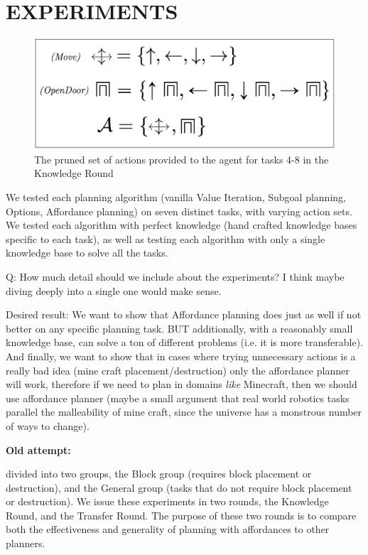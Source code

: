 \documentclass[]{article}
\begin{document}
\section{EXPERIMENTS}

\begin{figure}
\centering
\includegraphics[scale=0.2]{figures/reg_actions.png}
\caption{The pruned set of actions provided to the agent for tasks 4-8 in the Knowledge Round \label{fig:reg_actions}}
\end{figure}

We tested each planning algorithm (vanilla Value Iteration, Subgoal planning, Options, Affordance planning) on seven distinct tasks, with varying action sets. We tested each algorithm with perfect knowledge (hand crafted knowledge bases specific to each task), as well as testing each algorithm with only a single knowledge base to solve all the tasks. 

Q: How much detail should we include about the experiments? I think maybe diving deeply into a single one would make sense.

Desired result: We want to show that Affordance planning does just as well if not better on any specific planning task. BUT additionally, with a reasonably small knowledge base, can solve a ton of different problems (i.e. it is more transferable). And finally, we want to show that in cases where trying unnecessary actions is a really bad idea (mine craft placement/destruction) only the affordance planner will work, therefore if we need to plan in domains {\it like} Minecraft, then we should use affordance planner (maybe a small argument that real world robotics tasks parallel the malleability of mine craft, since the universe has a monstrous number of ways to change).


{\bf Old attempt:}

 divided into two groups, the Block group (requires block placement or destruction), and the General group (tasks that do not require block placement or destruction). We issue these experiments in two rounds, the Knowledge Round, and the Transfer Round. The purpose of these two rounds is to compare both the effectiveness and generality of planning with affordances to other planners.
\end{document}

